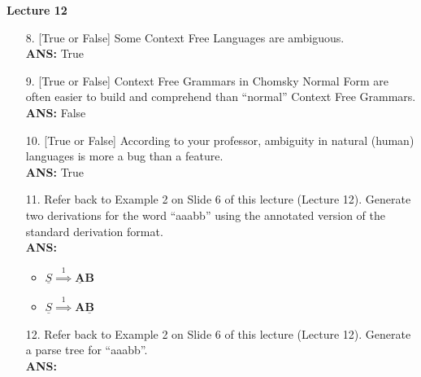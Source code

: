\documentclass[letterpaper, 12 pt]{article}
\begin{document}
\Large \textbf{Lecture 12}

\normalsize

\begin{enumerate}
    \item[8.] [True or False] Some Context Free Languages are ambiguous. \\
        \textbf{ANS:} True

    \item[9.] [True or False] Context Free Grammars in Chomsky Normal Form are
        often easier to build and comprehend than “normal” Context Free
        Grammars. \\
        \textbf{ANS:} False

    \item[10.] [True or False] According to your professor, ambiguity in natural
        (human) languages is more a bug than a feature. \\
        \textbf{ANS:} True

    \item[11.] Refer back to Example 2 on Slide 6 of this lecture (Lecture 12).
        Generate two derivations for the word “aaabb” using the annotated
        version of the standard derivation format. \\
        \textbf{ANS:} 
        \begin{itemize}
            \item $
                \underline{S} \overset{1}{\implies} \bm{\underline{A}B}
                $
            \item $
                \underline{S} \overset{1}{\implies} \bm{A\underline{B}}
                $
        \end{itemize}

    \item[12.] Refer back to Example 2 on Slide 6 of this lecture (Lecture 12).
        Generate a parse tree for “aaabb”. \\
        \textbf{ANS:} 


\end{enumerate}
\end{document}
